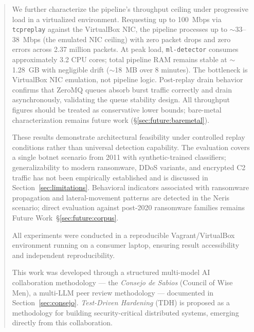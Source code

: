 \documentclass[11pt,a4paper]{article}
\begin{document}
\begin{abstract}
        We further characterize the pipeline's throughput ceiling under progressive load in a
        virtualized environment. Requesting up to 100~Mbps via \texttt{tcpreplay} against the
        VirtualBox NIC, the pipeline processes up to ${\sim}$33--38~Mbps (the emulated NIC ceiling)
        with zero packet drops and zero errors across 2.37 million packets. At peak load,
        \texttt{ml-detector} consumes approximately 3.2 CPU cores; total pipeline RAM remains stable
        at ${\sim}$1.28~GB with negligible drift (${\sim}$18~MB over 8 minutes). The bottleneck is
        VirtualBox NIC emulation, not pipeline logic. Post-replay drain behavior confirms that
        ZeroMQ queues absorb burst traffic correctly and drain asynchronously, validating the queue
        stability design. All throughput figures should be treated as conservative lower bounds;
        bare-metal characterization remains future work (\S\ref{sec:future:baremetal}).

        These results demonstrate architectural feasibility under controlled replay conditions rather
        than universal detection capability. The evaluation covers a single botnet scenario from 2011
        with synthetic-trained classifiers; generalizability to modern ransomware, DDoS variants, and
        encrypted C2 traffic has not been empirically established and is discussed in
        Section~\ref{sec:limitations}. Behavioral indicators associated with ransomware propagation
        and lateral-movement patterns are detected in the Neris scenario; direct evaluation against
        post-2020 ransomware families remains Future Work~\S\ref{sec:future:corpus}.

        All experiments were conducted in a reproducible Vagrant/VirtualBox environment running on a
        consumer laptop, ensuring result accessibility and independent reproducibility.

        This work was developed through a structured multi-model AI collaboration methodology ---
        the \emph{Consejo de Sabios} (Council of Wise Men), a multi-LLM peer review methodology ---
        documented in Section~\ref{sec:consejo}. \emph{Test-Driven Hardening} (TDH) is proposed
        as a methodology for building security-critical distributed systems, emerging directly from
        this collaboration.


\end{abstract}
\end{document}
